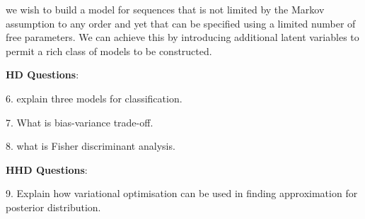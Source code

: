 \documentclass[11pt,a4paper]{article}
\newcommand{\BOLD}[1]{\textbf{#1}}
\begin{document}
we wish to build a model for sequences that is not limited by the Markov assumption to any order and yet that can be specified using a limited number of free parameters.
We can achieve this by introducing additional latent variables to permit a rich class of models to be constructed.

\BOLD{HD Questions}:

6. explain three models for classification.

7. What is bias-variance trade-off.

8. what is Fisher discriminant analysis.

\BOLD{HHD Questions}:

9. Explain how variational optimisation can be used in finding approximation for posterior distribution.
\end{document}
